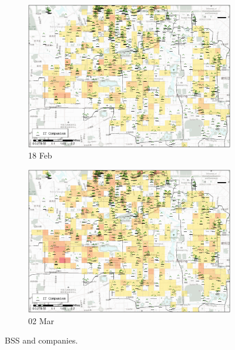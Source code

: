 \documentclass[preprints,ijgi,submit,moreauthors]{Definitions/mdpi}
\begin{document}
\begin{figure}[ht]
    \vspace{6pt}
    \begin{subfigure}{.334\textwidth}
        \includegraphics[width=\textwidth]{Figures/Relation_with_POIs/POI_compD2020_02_18.eps}
        \caption{18 Feb}
    \end{subfigure}
        \begin{subfigure}{.334\textwidth}
        \includegraphics[width=\textwidth]{Figures/Relation_with_POIs/POI_compD2020_03_02.eps}
        \caption{02 Mar}
    \end{subfigure}
    \caption{BSS and companies.}
    \label{fig:BSS_companies}
\end{figure}








\end{document}

